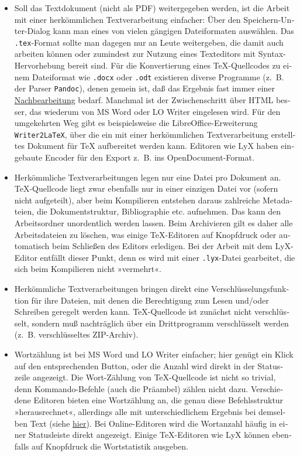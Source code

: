 \documentclass[11pt,a4paper,ngerman,french,DIV=8]{scrartcl}
\begin{document}
\begin{otherlanguage}{ngerman}
\begin{itemize}
  \item Soll das Textdokument (nicht als PDF) weitergegeben werden, ist die Arbeit mit einer herkömmlichen Textverarbeitung einfacher: Über den Speichern-Unter-Dialog kann man eines von vielen gängigen Dateiformaten auswählen. Das \texttt{.tex}-Format sollte man dagegen nur an Leute weitergeben, die damit auch arbeiten können oder zumindest zur Nutzung eines Texteditors mit Syntax-Hervorhebung bereit sind. Für die Konvertierung eines \TeX{}-Quellcodes zu einem Dateiformat wie \texttt{.docx} oder \texttt{.odt} existieren diverse Programme (z.~B. der Parser \texttt{Pandoc}), denen gemein ist, daß das Ergebnis fast immer einer \href{https://www.teuderun.de/latex/transformation/}{Nachbearbeitung} bedarf. Manchmal ist der Zwischenschritt über HTML besser, das wiederum von MS Word oder LO Writer eingelesen wird. Für den umgekehrten Weg gibt es beispielsweise die LibreOffice-Erweiterung \texttt{Writer2LaTeX}, über die ein mit einer herkömmlichen Textverarbeitung erstelltes Dokument für \TeX{} aufbereitet werden kann. Editoren wie LyX haben eingebaute Encoder für den Export z.~B. ins OpenDocument-Format.
  \item Herkömmliche Textverarbeitungen legen nur eine Datei pro Dokument an. \TeX{}-Quellcode liegt zwar ebenfalls nur in einer einzigen Datei vor (sofern nicht aufgeteilt), aber beim Kompilieren entstehen daraus zahlreiche Metadateien, die Dokumentstruktur, Bibliographie etc. aufnehmen. Das kann den Arbeitsordner unordentlich werden lassen. Beim Archivieren gilt es daher alle Arbeitsdateien zu löschen, was einige \TeX{}-Editoren auf Knopfdruck oder automatisch beim Schließen des Editors erledigen. Bei der Arbeit mit dem LyX-Editor entfällt dieser Punkt, denn es wird mit einer \texttt{.lyx}-Datei gearbeitet, die sich beim Kompilieren nicht »vermehrt«.
  \item Herkömmliche Textverarbeitungen bringen direkt eine Verschlüsselungsfunktion für ihre Dateien, mit denen die Berechtigung zum Lesen und/oder Schreiben geregelt werden kann. \TeX{}-Quellcode ist zunächst nicht verschlüsselt, sondern muß nachträglich über ein Drittprogramm verschlüsselt werden (z.~B. verschlüsseltes ZIP-Archiv).
  \item Wortzählung ist bei MS Word und LO Writer einfacher; hier genügt ein Klick auf den entsprechenden Button, oder die Anzahl wird direkt in der Statuszeile angezeigt. Die Wort-Zählung von \TeX{}-Quellcode ist nicht so trivial, denn Kommando-Befehle (auch die Präambel) zählen nicht dazu. Verschiedene Editoren bieten eine Wortzählung an, die genau diese Befehlsstruktur »herausrechnet«, allerdings alle mit unterschiedlichem Ergebnis bei demselben Text (siehe \href{https://www.teuderun.de/latex/n\%C3\%BCtzliche-kniffe/w\%C3\%B6rter-z\%C3\%A4hlen/}{hier}). Bei Online-Editoren wird die Wortanzahl häufig in einer Statusleiste direkt angezeigt. Einige \TeX{}-Editoren wie LyX können ebenfalls auf Knopfdruck die Wortstatistik ausgeben.

\end{itemize}
\end{otherlanguage}
\end{document}
